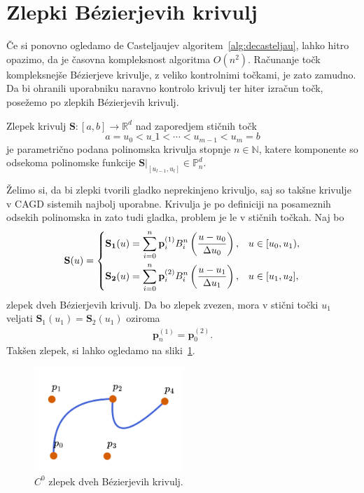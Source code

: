 \documentclass[isrm2, tisk]{fmfdelo}
\newcommand{\R}{\mathbb R}
\newcommand{\N}{\mathbb N}
\newcommand{\Pn}{\mathbb P_n}
\newcommand{\p}{\mathbf{p}}
\begin{document}
    \section{Zlepki Bézierjevih krivulj}
    Če si ponovno ogledamo de Casteljaujev algoritem~\ref{alg:decasteljau}, lahko hitro opazimo, da je časovna kompleksnost algoritma $O(n^2)$.
    Računanje točk kompleksnejše Bézierjeve krivulje, z veliko kontrolnimi točkami,  je zato zamudno.
    Da bi ohranili uporabniku naravno kontrolo krivulj ter hiter izračun točk, posežemo po zlepkih Bézierjevih krivulj.
    \begin{definicija}
        Zlepek krivulj $\mathbf{S}:[a,b]\to \R^d$ nad zaporedjem stičnih točk \[a=u_0 < u\_1 < \cdots < u_{m-1} < u_m = b\] je parametrično podana polinomska krivulja stopnje $n\in\N$, katere komponente so odsekoma polinomske funkcije $\mathbf{S}|_{[u_{l-1},u_l]} \in \Pn^d$.
    \end{definicija}
    \noindent Želimo si, da bi zlepki tvorili gladko neprekinjeno krivuljo, saj so takšne krivulje v CAGD sistemih najbolj uporabne.
    Krivulja je po definiciji na posameznih odsekih polinomska in zato tudi gladka, problem je le v stičnih točkah.
    Naj bo
    \begin{align}
        \mathbf{S}(u) = \begin{dcases}
                            \mathbf{S_1}(u) = \sum_{i=0}^n \p_i^{(1)}B_i^n\left(\frac{u-u_0}{\Delta u_0}\right), & u \in [u_0,u_1),  \\
                            \mathbf{S_2}(u) = \sum_{i=0}^n \p_i^{(2)}B_i^n\left(\frac{u-u_1}{\Delta u_1}\right), & u \in [u_1,u_2],
        \end{dcases} \label{eq:zlepek-def}
    \end{align}
    zlepek dveh Bézierjevih krivulj.
    Da bo zlepek zvezen, mora v stični točki $u_1$ veljati $\mathbf{S}_1(u_1) = \mathbf{S}_2(u_1)$ oziroma
    \begin{align}
        \label{c0-zlepek-ref}
        \p_n^{(1)} = \p_0^{(2)}.
    \end{align}
    Takšen zlepek, si lahko ogledamo na sliki~\ref{fig:zlepek-c0}.
    \begin{figure}[h]
        \centering
        \includegraphics[width = 0.50\textwidth]{images/zlepek-c0}
        \caption{$C^0$ zlepek dveh Bézierjevih krivulj.}
        \label{fig:zlepek-c0}
    \end{figure}
\end{document}
